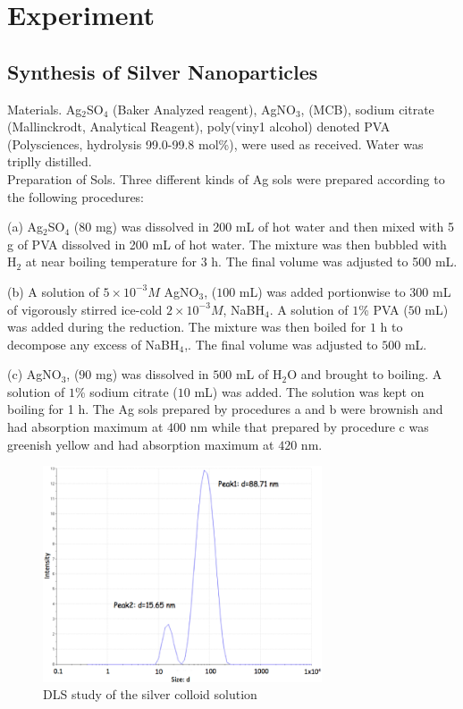 \documentclass[twocolumn,showpacs,preprintnumbers,amsmath,amssymb]{revtex4}
\begin{document}
\section{Experiment}
\subsection{Synthesis of Silver Nanoparticles}
Materials. Ag$_2$SO$_4$ (Baker Analyzed reagent), AgNO$_3$,
(MCB), sodium citrate (Mallinckrodt, Analytical Reagent),
poly(viny1 alcohol) denoted PVA (Polysciences, hydrolysis
99.0-99.8  mol\%), were used as received.
Water was triplly distilled.
\\
Preparation of Sols. Three different kinds of Ag sols
were prepared  according to the following procedures:

(a) Ag$_2$SO$_4$ (80 mg) was dissolved in 200 mL of hot
water and then mixed with 5 g of PVA dissolved in 200
mL of hot water.  The mixture was then bubbled with H$_2$
at near boiling temperature for $3$ h.  The final volume was
adjusted to 500 mL.

(b) A solution of  $5 \times 10^{-3} M $ AgNO$_3$,  ($100$ mL) was added
portionwise to 300 mL of vigorously stirred ice-cold  $2 \times
10^{-3} M$, NaBH$_4$. A solution of  $1$\% PVA ($50$ mL) was added
during the reduction.  The mixture was then boiled for $1$ h to
decompose any excess of NaBH$_4$,.  The final volume
was adjusted to $500$ mL.

(c) AgNO$_3$,  ($90$ mg) was dissolved in $500$ mL of  H$_2$O and
brought to boiling.  A solution of  $1$\% sodium citrate ($10$
mL) was added.  The solution was kept on boiling for 1 h.
The Ag  sols  prepared  by  procedures  a  and  b  were
brownish and had absorption maximum at $400$ nm while
that prepared by procedure c was greenish yellow and had
absorption maximum at $420$ nm.

\begin{figure}[!h]
  \includegraphics[width=3.25in]{figure/DLS.png}
  \caption{DLS study of the silver colloid solution}
  \label{fig:setup}
\end{figure}
\end{document}
